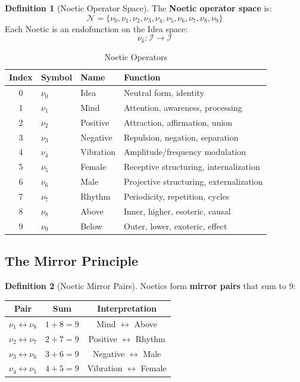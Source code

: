 \documentclass[11pt,twoside,openright]{book}
\theoremstyle{definition}
\newtheorem{definition}{Definition}[chapter]
\theoremstyle{plain}
\theoremstyle{remark}
\newcommand{\Ideas}{\mathcal{I}}
\newcommand{\Noetics}{\mathcal{N}}
\newcommand{\noe}[1]{\nu_{#1}}
\begin{document}
\begin{definition}[Noetic Operator Space]
\label{def:noetic-space}
The \textbf{Noetic operator space} is:
\[
\Noetics = \{\noe{0}, \noe{1}, \noe{2}, \noe{3}, \noe{4}, \noe{5}, \noe{6}, \noe{7}, \noe{8}, \noe{9}\}
\]
Each Noetic is an endofunction on the Idea space:
\[
\noe{k} : \Ideas \to \Ideas
\]
\end{definition}

\begin{table}[h]
\centering
\caption{Noetic Operators}
\label{tab:noetics}
\begin{tabular}{clll}
\toprule
\textbf{Index} & \textbf{Symbol} & \textbf{Name} & \textbf{Function} \\
\midrule
0 & $\noe{0}$ & Idea & Neutral form, identity \\
1 & $\noe{1}$ & Mind & Attention, awareness, processing \\
2 & $\noe{2}$ & Positive & Attraction, affirmation, union \\
3 & $\noe{3}$ & Negative & Repulsion, negation, separation \\
4 & $\noe{4}$ & Vibration & Amplitude/frequency modulation \\
5 & $\noe{5}$ & Female & Receptive structuring, internalization \\
6 & $\noe{6}$ & Male & Projective structuring, externalization \\
7 & $\noe{7}$ & Rhythm & Periodicity, repetition, cycles \\
8 & $\noe{8}$ & Above & Inner, higher, esoteric, causal \\
9 & $\noe{9}$ & Below & Outer, lower, exoteric, effect \\
\bottomrule
\end{tabular}
\end{table}

\subsection{The Mirror Principle}

\begin{definition}[Noetic Mirror Pairs]
\label{def:mirror-pairs}
Noetics form \textbf{mirror pairs} that sum to 9:
\begin{center}
\begin{tabular}{ccc}
\toprule
\textbf{Pair} & \textbf{Sum} & \textbf{Interpretation} \\
\midrule
$\noe{1} \leftrightarrow \noe{8}$ & $1 + 8 = 9$ & Mind $\leftrightarrow$ Above \\
$\noe{2} \leftrightarrow \noe{7}$ & $2 + 7 = 9$ & Positive $\leftrightarrow$ Rhythm \\
$\noe{3} \leftrightarrow \noe{6}$ & $3 + 6 = 9$ & Negative $\leftrightarrow$ Male \\
$\noe{4} \leftrightarrow \noe{5}$ & $4 + 5 = 9$ & Vibration $\leftrightarrow$ Female \\
\bottomrule
\end{tabular}
\end{center}
\end{definition}
\end{document}
